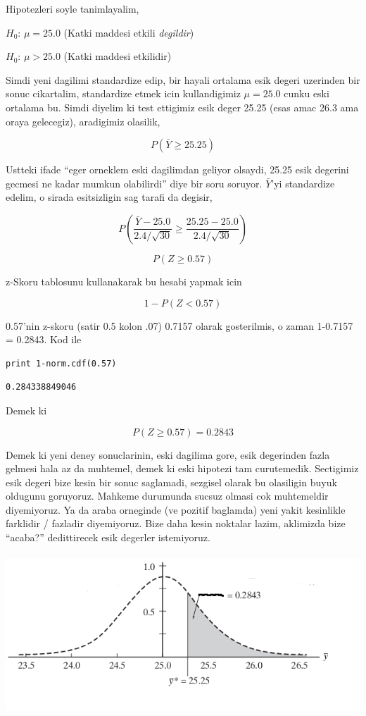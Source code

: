 \documentclass[12pt,fleqn]{article}\usepackage{../common}
\begin{document}
Hipotezleri soyle tanimlayalim,

$H_0$: $\mu = 25.0$ (Katki maddesi etkili {\em degildir})

$H_0$: $\mu > 25.0$ (Katki maddesi etkilidir)

Simdi yeni dagilimi standardize edip, bir hayali ortalama esik degeri
uzerinden bir sonuc cikartalim, standardize etmek icin kullandigimiz $\mu =
25.0$
cunku eski ortalama bu. Simdi diyelim ki test ettigimiz esik deger 25.25
(esas  amac 26.3 ama oraya gelecegiz), aradigimiz olasilik,

$$ P(\bar{Y}  \ge 25.25) $$

Ustteki ifade ``eger orneklem eski dagilimdan geliyor olsaydi, 25.25
esik degerini gecmesi ne kadar mumkun olabilirdi'' diye bir soru
soruyor. $\bar{Y}$'yi standardize edelim, o sirada esitsizligin sag tarafi da
degisir,

$$ P(\frac{\bar{Y} - 25.0}{2.4 / \sqrt{30}} \ge 
\frac{25.25 - 25.0}{2.4 / \sqrt{30}}) 
$$


$$ P(Z \ge 0.57)$$

z-Skoru tablosunu kullanakarak bu hesabi yapmak icin

$$ 1 - P(Z < 0.57)$$

0.57'nin z-skoru (satir 0.5 kolon .07) 0.7157 olarak gosterilmis, o zaman
1-0.7157 = 0.2843. Kod ile

\begin{verbatim}
print 1-norm.cdf(0.57)
\end{verbatim}

\begin{verbatim}
0.284338849046
\end{verbatim}

Demek ki

$$ P(Z \ge 0.57) = 0.2843$$

Demek ki yeni deney sonuclarinin, eski dagilima gore, esik degerinden fazla
gelmesi hala az da muhtemel, demek ki eski hipotezi tam
curutemedik. Sectigimiz esik degeri bize kesin bir sonuc saglamadi,
sezgisel olarak bu olasiligin buyuk oldugunu goruyoruz. Mahkeme durumunda
sucsuz olmasi cok muhtemeldir diyemiyoruz. Ya da araba orneginde (ve
pozitif baglamda) yeni yakit kesinlikle farklidir / fazladir
diyemiyoruz. Bize daha kesin noktalar lazim, aklimizda bize ``acaba?''
dedittirecek esik degerler istemiyoruz.

\includegraphics[height=6cm]{carhyp1.png}
\end{document}

